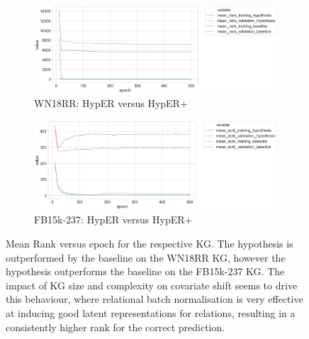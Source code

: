 
\begin{figure}
	\begin{subfigure}[b]{.5\linewidth}
   		\centering
    		\includegraphics[width=1.0\linewidth, height=0.6\linewidth]{WN18RR_mean_rank_Results}
		\captionsetup{justification=centering}
		\caption{WN18RR: HypER versus HypER+}
	\end{subfigure}
	\begin{subfigure}[b]{.5\linewidth}
   		\centering
		\includegraphics[width=1.0\linewidth, height=0.6\linewidth]{FB15k-237_mean_rank_Results}
		\captionsetup{justification=centering}
		\caption{FB15k-237: HypER versus HypER+}
	\end{subfigure}
	\caption{Mean Rank versus epoch for the respective KG. The hypothesis is outperformed by the baseline on the WN18RR KG, however the hypothesis outperforms the baseline on the FB15k-237 KG. The impact of KG size and complexity on covariate shift seems to drive this behaviour, where relational batch normalisation is very effective at inducing good latent representations for relations, resulting in a consistently higher rank for the correct prediction.}
\end{figure}

